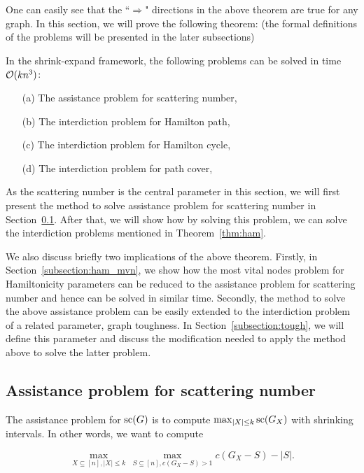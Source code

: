 One can easily see that the ``$\Rightarrow$" directions in the above theorem are true for any graph. In this section, we will prove the following theorem: (the formal definitions of the problems will be presented in the later subsections)

\begin{theorem}
\label{thm:ham}
In the shrink-expand framework, the following problems can be solved in time $\mathcal{O}(kn^3)$:
\begin{itemize}
	\item[(a)] The assistance problem for scattering number,
	\item[(b)] The interdiction problem for Hamilton path,
	\item[(c)] The interdiction problem for Hamilton cycle,
	\item[(d)] The interdiction problem for path cover,
\end{itemize}
\end{theorem}

As the scattering number is the central parameter in this section, we will first present the method to solve  assistance problem for scattering number in Section~\ref{subsection:scat}.
After that, we will show how by solving this problem, we can solve the interdiction problems mentioned in Theorem~\ref{thm:ham}.

We also discuss briefly two implications of the above theorem. 
Firstly, in Section~\ref{subsection:ham_mvn}, we show how the most vital nodes problem for Hamiltonicity parameters can be reduced to the assistance problem for scattering number and hence can be solved in similar time. 
Secondly, the method to solve the above assistance problem can be easily extended to the interdiction problem of a related parameter, graph toughness. 
In Section~\ref{subsection:tough}, we will define this parameter and discuss the modification needed to apply the method above to solve the latter problem. 

\subsection{Assistance problem for scattering number}
\label{subsection:scat}

The assistance problem for $\text{sc}(G)$ is to compute $\max_{|X| \leq k}\text{sc}(G_X)$ with shrinking intervals. 
In other words, we want to compute 

\begin{equation}
\label{eq:scat_assist}
  \max_{X \subseteq [n], |X| \leq k} \, \max_{S \subseteq [n], c(G_X - S) > 1} c(G_X - S) - |S|.
\end{equation}

